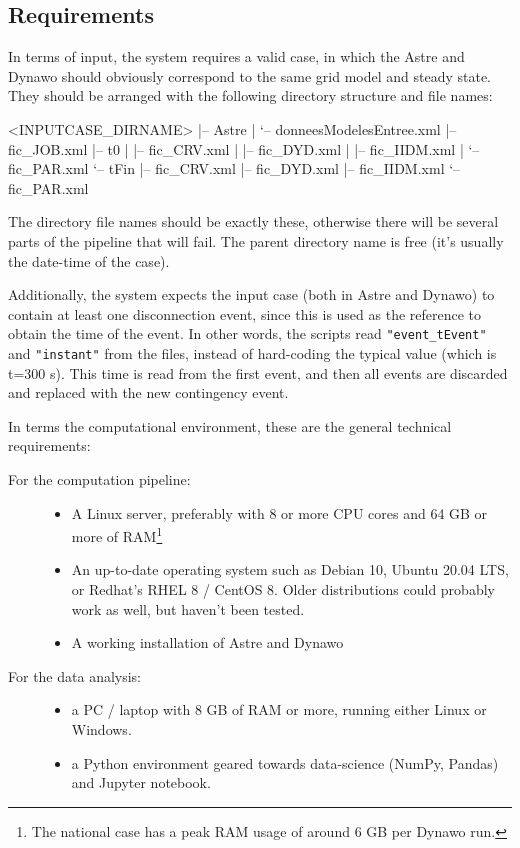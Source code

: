 \documentclass[11pt, a4paper, twoside, titlepage]{article}
\newcommand{\code}[1]{\texttt{#1}}
\begin{document}
\subsection{Requirements}
\label{subsec:reqmts}

In terms of input, the system requires a valid case, in which the
Astre and Dynawo should obviously correspond to the same grid model
and steady state.  They should be arranged with the following
directory structure and file names:
\begin{console}
  <INPUTCASE_DIRNAME>
  |-- Astre
  |   `-- donneesModelesEntree.xml
  |-- fic_JOB.xml
  |-- t0
  |   |-- fic_CRV.xml
  |   |-- fic_DYD.xml
  |   |-- fic_IIDM.xml
  |   `-- fic_PAR.xml
  `-- tFin
      |-- fic_CRV.xml
      |-- fic_DYD.xml
      |-- fic_IIDM.xml
      `-- fic_PAR.xml
\end{console}

The directory file names should be exactly these, otherwise there will
be several parts of the pipeline that will fail. The parent directory
name is free (it's usually the date-time of the case).

Additionally, the system expects the input case (both in Astre and
Dynawo) to contain at least one disconnection event, since this is
used as the reference to obtain the time of the event. In other words,
the scripts read \code{"event\_tEvent"} and \code{"instant"} from
the files, instead of hard-coding the typical value (which is t=300
s). This time is read from the first event, and then all events are
discarded and replaced with the new contingency event.

In terms the computational environment, these are the general
technical requirements:
\begin{description}
\item[For the computation pipeline:] \hfill
  \begin{itemize}
  \item A Linux server, preferably with 8 or more CPU cores and 64 GB
    or more of RAM\footnote{The national case has a peak RAM usage of
      around 6 GB per Dynawo run.}
  \item An up-to-date operating system such as Debian 10, Ubuntu 20.04
    LTS, or Redhat's RHEL 8 / CentOS 8. Older distributions could
    probably work as well, but haven't been tested.
  \item A working installation of Astre and Dynawo
  \end{itemize}
\item[For the data analysis:] \hfill
  \begin{itemize}
  \item a PC / laptop with 8 GB of RAM or more, running either Linux or
    Windows.
  \item a Python environment geared towards data-science (NumPy,
    Pandas) and Jupyter notebook.
  \end{itemize}
\end{description}
\end{document}
